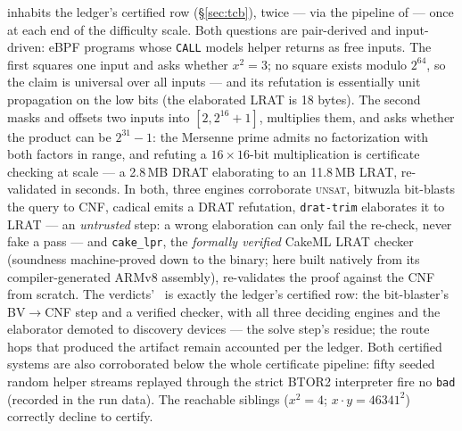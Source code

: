  inhabits the ledger's certified row
(\S\ref{sec:tcb}), twice --- via the pipeline of  --- once at each end of the difficulty
scale. Both questions are pair-derived and input-driven: eBPF programs
whose \texttt{CALL} models helper returns as free inputs. The first
squares one input and asks whether $x^2 = 3$; no square exists modulo
$2^{64}$, so the claim is universal over all inputs --- and its
refutation is essentially unit propagation on the low bits (the
elaborated LRAT is 18 bytes). The second masks and offsets two inputs
into $[2, 2^{16}{+}1]$, multiplies them, and asks whether the product
can be $2^{31}-1$: the Mersenne prime admits no factorization with
both factors in range, and refuting a $16{\times}16$-bit
multiplication is certificate checking at scale --- a 2.8\,MB DRAT
elaborating to an 11.8\,MB LRAT, re-validated in seconds. In both,
three engines corroborate \textsc{unsat}, bitwuzla bit-blasts the
query to CNF, cadical emits a DRAT refutation, \texttt{drat-trim}
elaborates it to LRAT --- an \emph{untrusted} step: a wrong
elaboration can only fail the re-check, never fake a pass --- and
\texttt{cake\_lpr}, the \emph{formally verified} CakeML LRAT checker
(soundness machine-proved down to the binary; here built natively
from its compiler-generated ARMv8 assembly), re-validates the proof
against the CNF from scratch.
The verdicts' \tcb\ is exactly the ledger's certified row: the
bit-blaster's BV$\to$CNF step and a verified checker, with all three
deciding engines and the elaborator demoted to discovery devices ---
the solve step's residue; the route hops that produced the artifact
remain accounted per the ledger. Both certified systems are also
corroborated below the whole certificate pipeline: fifty seeded random
helper streams replayed through the strict BTOR2 interpreter fire no
\texttt{bad} (recorded in the run data). The
reachable siblings ($x^2 = 4$; $x{\cdot}y = 46341^2$) correctly
decline to certify.

